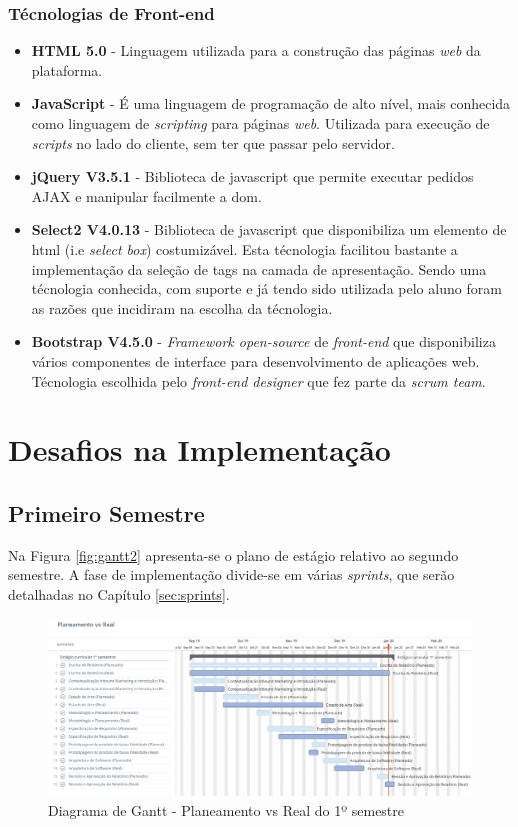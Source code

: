 \subsubsection{Técnologias de Front-end}
\begin{itemize}
	\item \textbf{HTML 5.0} - Linguagem utilizada para a construção das páginas \textit{web} da plataforma.
	\item \textbf{JavaScript} - É uma linguagem de programação de alto nível, mais conhecida como linguagem de \textit{scripting} para páginas \textit{web}. Utilizada para execução de \textit{scripts} no lado do cliente, sem ter que passar pelo servidor.
	\item \textbf{jQuery V3.5.1} - Biblioteca de javascript que permite executar pedidos AJAX e manipular facilmente a \acrfull{dom}. 
	\item \textbf{Select2 V4.0.13} - Biblioteca de javascript que disponibiliza um elemento de html (i.e \textit{select box}) costumizável. Esta técnologia facilitou bastante a implementação da seleção de tags na camada de apresentação. Sendo uma técnologia conhecida, com suporte e já tendo sido utilizada pelo aluno foram as razões que incidiram na escolha da técnologia.
	\item \textbf{Bootstrap V4.5.0} - \textit{Framework open-source} de \textit{front-end} que disponibiliza vários componentes de interface para desenvolvimento de aplicações web. Técnologia escolhida pelo \textit{front-end designer} que fez parte da \textit{scrum team}.
\end{itemize}


\section{Desafios na Implementação}
\label{sec:dificuldades}

\subsection{Primeiro Semestre}

Na Figura \ref{fig:gantt2} apresenta-se o plano de estágio relativo ao segundo semestre. A fase de implementação divide-se em várias \textit{sprints}, que serão detalhadas no Capítulo \ref{sec:sprints}.


\begin{figure}[ht!]
	\begin{center}
		\includegraphics[width=1\textwidth]{img/gantt/vs.jpeg}
		\caption{Diagrama de Gantt - Planeamento vs Real do 1º semestre}
		\label{fig:ganttvs1}
	\end{center}
\end{figure}

